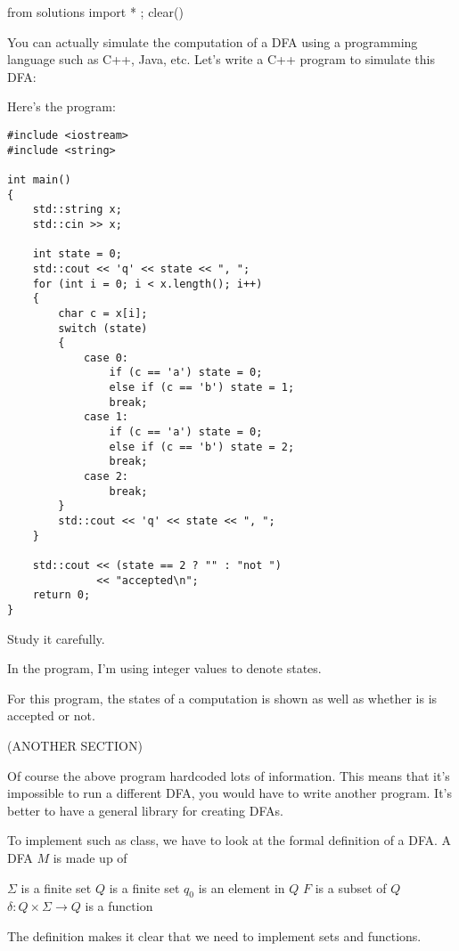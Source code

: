 \begin{python0}
  from solutions import * ; clear()
\end{python0}

You can actually simulate the computation
of a DFA using a programming language such as C++, Java, etc.
Let's write a C++ program to simulate this DFA:



Here's the program:
\begin{Verbatim}[frame=single, fontsize=\small]
#include <iostream>
#include <string>

int main()
{
    std::string x;
    std::cin >> x;

    int state = 0;
    std::cout << 'q' << state << ", ";
    for (int i = 0; i < x.length(); i++)
    {
        char c = x[i];
        switch (state)
        {
            case 0:
                if (c == 'a') state = 0;
                else if (c == 'b') state = 1;
                break;
            case 1:
                if (c == 'a') state = 0;
                else if (c == 'b') state = 2;
                break;
            case 2:
                break;
        } 
        std::cout << 'q' << state << ", ";
    }
   
    std::cout << (state == 2 ? "" : "not ")
              << "accepted\n";
    return 0;
}
\end{Verbatim}
Study it carefully.

In the program, I'm using integer values to denote states.

For this program, the states of a computation is shown as well as whether is
is accepted or not.



(ANOTHER SECTION)

Of course the above program hardcoded lots of information.
This means that it's impossible to run a different DFA, you would have to
write another program.
It's better to have a general library for creating DFAs.

To implement such as class, we have to look at the
formal definition of a DFA.
A DFA $M$ is made up of
\begin{enumerate}[label=\textnormal{(\alph*)},itemsep=0pt,nosep,noitemsep,partopsep=0pt,topsep=0pt,parsep=0pt]
  \li $\Sigma$ is a finite set
  \li $Q$ is a finite set
  \li $q_0$ is an element in $Q$
  \li $F$ is a subset of $Q$
  \li $\delta: Q \times \Sigma \rightarrow Q$ is a function 
\end{enumerate}
The definition makes it clear that we need to implement
sets and functions.

